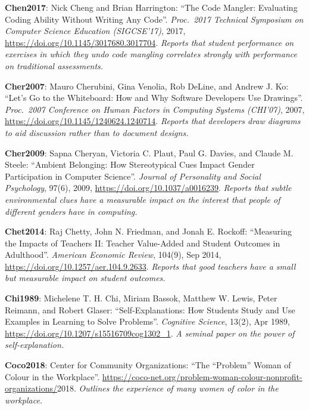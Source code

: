 \textbf{\hypertarget{b:Chen2017}{Chen2017}\label{b:Chen2017}}: Nick Cheng and Brian Harrington: ``The Code Mangler: Evaluating Coding Ability Without Writing Any Code''. \emph{Proc.\ 2017 Technical Symposium on Computer Science Education (SIGCSE'17)}, 2017, \url{https://doi.org/10.1145/3017680.3017704}. \emph{Reports that student performance on exercises in which they undo code mangling correlates strongly with performance on traditional assessments.}

\textbf{\hypertarget{b:Cher2007}{Cher2007}\label{b:Cher2007}}: Mauro Cherubini, Gina Venolia, Rob DeLine, and Andrew J. Ko: ``Let's Go to the Whiteboard: How and Why Software Developers Use Drawings''. \emph{Proc.\ 2007 Conference on Human Factors in Computing Systems (CHI'07)}, 2007, \url{https://doi.org/10.1145/1240624.1240714}. \emph{Reports that developers draw diagrams to aid discussion rather than to document designs.}

\textbf{\hypertarget{b:Cher2009}{Cher2009}\label{b:Cher2009}}: Sapna Cheryan, Victoria C. Plaut, Paul G. Davies, and Claude M. Steele: ``Ambient Belonging: How Stereotypical Cues Impact Gender Participation in Computer Science''. \emph{Journal of Personality and Social Psychology}, 97(6), 2009, \url{https://doi.org/10.1037/a0016239}. \emph{Reports that subtle environmental clues have a measurable impact on the interest that people of different genders have in computing.}

\textbf{\hypertarget{b:Chet2014}{Chet2014}\label{b:Chet2014}}: Raj Chetty, John N. Friedman, and Jonah E. Rockoff: ``Measuring the Impacts of Teachers II: Teacher Value-Added and Student Outcomes in Adulthood''. \emph{American Economic Review}, 104(9), Sep 2014, \url{https://doi.org/10.1257/aer.104.9.2633}. \emph{Reports that good teachers have a small but measurable impact on student outcomes.}

\textbf{\hypertarget{b:Chi1989}{Chi1989}\label{b:Chi1989}}: Michelene T. H. Chi, Miriam Bassok, Matthew W. Lewis, Peter Reimann, and Robert Glaser: ``Self-Explanations: How Students Study and Use Examples in Learning to Solve Problems''. \emph{Cognitive Science}, 13(2), Apr 1989, \url{https://doi.org/10.1207/s15516709cog1302_1}. \emph{A seminal paper on the power of self-explanation.}

\textbf{\hypertarget{b:Coco2018}{Coco2018}\label{b:Coco2018}}: Center for Community Organizations: ``The ``Problem'' Woman of Colour in the Workplace''. \url{https://coco-net.org/problem-woman-colour-nonprofit-organizations/}2018. \emph{Outlines the experience of many women of color in the workplace.}

